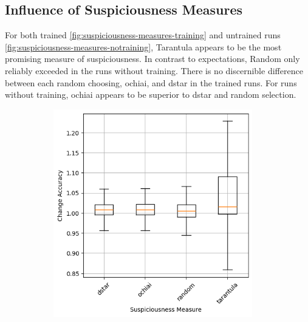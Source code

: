 \subsection{Influence of Suspiciousness Measures}\label{subsec:influence-of-suspiciousness-measures}
For both trained \ref{fig:suspiciousness-measures-training} and untrained runs \ref{fig:suspiciousness-measures-notraining}, Tarantula appears to be the most promising measure of suspiciousness.
In contrast to expectations, Random only reliably exceeded in the runs without training.
There is no discernible difference between each random choosing, ochiai, and dstar in the trained runs.
For runs without training, ochiai appears to be superior to dstar and random selection.
\begin{figure}
    \begin{subfigure}{0.5\textwidth}
        \centering
        \includegraphics[width=0.95\textwidth]{plots/Meassure_Trained_accuracy.png}
    \end{subfigure}
    \begin{subfigure}{0.5\textwidth}
        \centering

\end{subfigure}
\end{figure}
